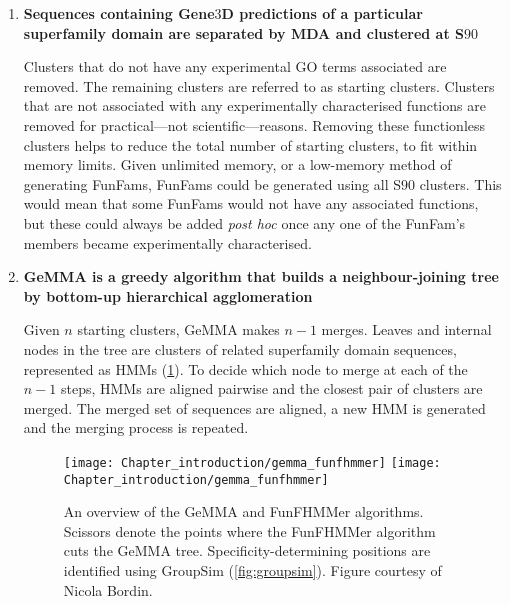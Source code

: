 \begin{enumerate}
    \item
        \textbf{Sequences containing Gene$3$D predictions of a particular superfamily domain are separated by MDA and clustered at S$90$}

        Clusters that do not have any experimental GO terms associated are removed. The remaining clusters are referred to as starting clusters. Clusters that are not associated with any experimentally characterised functions are removed for practical---not scientific---reasons. Removing these functionless clusters helps to reduce the total number of starting clusters, to fit within memory limits. Given unlimited memory, or a low-memory method of generating FunFams, FunFams could be generated using all S$90$ clusters. This would mean that some FunFams would not have any associated functions, but these could always be added \emph{post hoc} once any one of the FunFam's members became experimentally characterised.

    \item
        \textbf{GeMMA \cite{Lee2009} is a greedy algorithm that builds a neighbour-joining tree by bottom-up hierarchical agglomeration}

        Given $n$ starting clusters, GeMMA makes $n-1$ merges. Leaves and internal nodes in the tree are clusters of related superfamily domain sequences, represented as HMMs (\ref{fig:gemma_funfhmmer}). To decide which node to merge at each of the $n-1$ steps, HMMs are aligned pairwise and the closest pair of clusters are merged. The merged set of sequences are aligned, a new HMM is generated and the merging process is repeated.

        \begin{figure}[!hbt]
            \centering
            \ifredact
                \texttt{[image: Chapter\_introduction/gemma\_funfhmmer]}
            \else
                \texttt{[image: Chapter\_introduction/gemma\_funfhmmer]}
            \fi
            \caption{%
                An overview of the GeMMA and FunFHMMer algorithms.
                Scissors denote the points where the FunFHMMer algorithm cuts the GeMMA tree.
                Specificity-determining positions are identified using GroupSim (\ref{fig:groupsim}).
                Figure courtesy of Nicola Bordin.
            }
            \label{fig:gemma_funfhmmer}
        \end{figure}


\end{enumerate}
